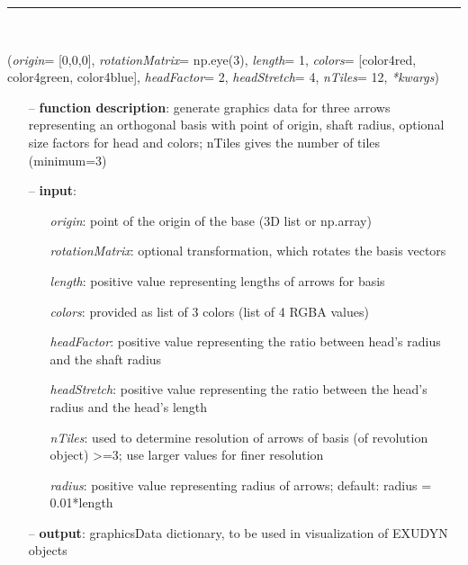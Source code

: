 \begin{itemize}[leftmargin=1.4cm]
\begin{itemize}[leftmargin=1.4cm]
\begin{itemize}[leftmargin=1.4cm]
\begin{itemize}[leftmargin=0.5cm]
\begin{itemize}[leftmargin=1.4cm]
\begin{itemize}[leftmargin=1.4cm]
\begin{itemize}[leftmargin=0.5cm]
\begin{itemize}[leftmargin=1.4cm]
\begin{itemize}[leftmargin=0.5cm]
%
\noindent\rule{8cm}{0.75pt}\vspace{1pt} \\ 
\begin{flushleft}
\label{sec:graphicsDataUtilities:GraphicsDataBasis}
({\it origin}= [0,0,0], {\it rotationMatrix}= np.eye(3), {\it length}= 1, {\it colors}= [color4red, color4green, color4blue], {\it headFactor}= 2, {\it headStretch}= 4, {\it nTiles}= 12, {\it **kwargs})
\end{flushleft}
\setlength{\itemindent}{0.7cm}
\begin{itemize}[leftmargin=0.7cm]
\item[--]
{\bf function description}: generate graphics data for three arrows representing an orthogonal basis with point of origin, shaft radius, optional size factors for head and colors; nTiles gives the number of tiles (minimum=3)
\item[--]
{\bf input}: \vspace{-6pt}
\begin{itemize}[leftmargin=1.2cm]
\setlength{\itemindent}{-0.7cm}
\item[]{\it origin}: point of the origin of the base (3D list or np.array)
\item[]{\it rotationMatrix}: optional transformation, which rotates the basis vectors
\item[]{\it length}: positive value representing lengths of arrows for basis
\item[]{\it colors}: provided as list of 3 colors (list of 4 RGBA values)
\item[]{\it headFactor}: positive value representing the ratio between head's radius and the shaft radius
\item[]{\it headStretch}: positive value representing the ratio between the head's radius and the head's length
\item[]{\it nTiles}: used to determine resolution of arrows of basis (of revolution object) >=3; use larger values for finer resolution
\item[]{\it radius}: positive value representing radius of arrows; default: radius = 0.01*length
\end{itemize}
\item[--]
{\bf output}: graphicsData dictionary, to be used in visualization of EXUDYN objects
\vspace{12pt}\end{itemize}

\end{itemize}
\end{itemize}
\end{itemize}
\end{itemize}
\end{itemize}
\end{itemize}
\end{itemize}
\end{itemize}
\end{itemize}
